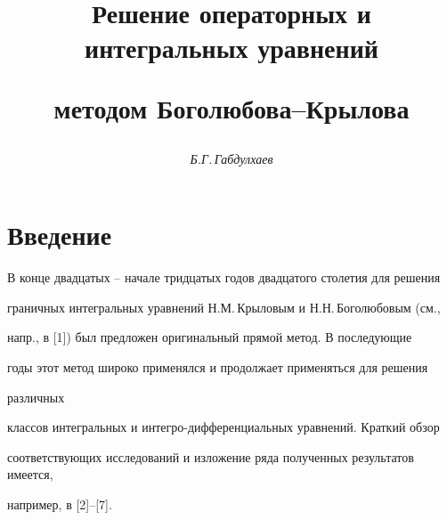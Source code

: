 




\author{\it Б.Г.\,Габдулхаев}




\title{Решение операторных и интегральных уравнений


методом Боголюбова--Крылова}





\date{}




\pagestyle{plain} %







\maketitle


\label{begin}











\section*{Введение}





В конце двадцатых -- начале тридцатых годов двадцатого столетия для решения


граничных интегральных уравнений Н.М.\,Крыловым и Н.Н.\,Боголюбовым (см.,


напр., в [1]) был предложен оригинальный прямой метод. В последующие


годы этот метод широко применялся и продолжает применяться для решения


различных


классов интегральных и интегро-дифференциальных уравнений. Краткий обзор


соответствующих исследований и изложение ряда полученных результатов имеется,


например, в [2]--[7].





